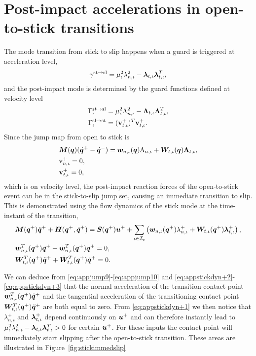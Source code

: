 \documentclass[../DC2017114Bouma.tex]{subfiles}
\begin{document}
\section{Post-impact accelerations in open-to-stick transitions}\label{app:instantslip}
The mode transition from stick to slip happens when a guard is triggered at acceleration level, 
\begin{align}
\gamma^{\text{st}\rightarrow\text{sl}} = \mu_{\iota}^2\lambda_{n,\iota}^2 - \boldsymbol{\lambda}_{t,\iota}\boldsymbol{\lambda}_{t,\iota}^T,
\end{align}
and the post-impact mode is determined by the guard functions defined at velocity level
\begin{align}
\Gamma^{\text{st}\rightarrow\text{sl}}_{\iota} &= \mu_{\iota}^2\Lambda_{n,\iota}^2 - \boldsymbol{\Lambda}_{t,\iota}\boldsymbol{\Lambda}_{t,\iota}^T,\\
\Gamma^{\text{sl}\rightarrow\text{st}}_{\iota} &= (\mathbf{v}^+_{t,\iota})^T\mathbf{v}^+_{t,\iota}.
\end{align}
Since the jump map from open to stick is
\begin{align}
&{\boldsymbol{M}}({\boldsymbol{q}})(\dot{{\boldsymbol{q}}}^+ - \dot{{\boldsymbol{q}}}^-) = {\boldsymbol{w}}_{n,\iota}({\boldsymbol{q}})\Lambda_{n,\iota} + {\boldsymbol{W}}_{t,\iota}({\boldsymbol{q}})\boldsymbol{\Lambda}_{t,\iota},\label{eq:appjump8}\\
&\mathrm{v}_{n,\iota}^+ = 0,\label{eq:appjump9}\\
&\mathbf{v}_{t,\iota}^+ = 0,\label{eq:appjump10}
\end{align}
which is on velocity level, the post-impact reaction forces of the open-to-stick event can be in the stick-to-slip jump set, causing an immediate transition to slip. This is demonstrated using the flow dynamics of the stick mode at the time-instant of the transition,
\begin{align}
&{\boldsymbol{M}}({\boldsymbol{q}}^+)\ddot{{\boldsymbol{q}}}^+ + {\boldsymbol{H}}({\boldsymbol{q}}^+,\dot{{\boldsymbol{q}}}^+) = {\boldsymbol{S}}({\boldsymbol{q}}^+){\boldsymbol{u}}^+ + \sum_{\iota\in\mathcal{I}_c}\left({\boldsymbol{w}}_{n,\iota}({\boldsymbol{q}}^+)\lambda^+_{n,\iota} + {\boldsymbol{W}}_{t,\iota}({\boldsymbol{q}}^+)\boldsymbol{\lambda}^+_{t,\iota} \right), \label{eq:appstickdyn+1}\\
&{\boldsymbol{w}}^T_{n,\iota}({\boldsymbol{q}}^+)\ddot{{\boldsymbol{q}}}^+ + \dot{{\boldsymbol{w}}}^T_{n,\iota}({\boldsymbol{q}}^+)\dot{{\boldsymbol{q}}}^+ = 0,\label{eq:appstickdyn+2}\\
&{\boldsymbol{W}}^T_{t,\iota}({\boldsymbol{q}}^+)\ddot{{\boldsymbol{q}}}^+ + \dot{{\boldsymbol{W}}}^T_{t,\iota}({\boldsymbol{q}}^+)\dot{{\boldsymbol{q}}}^+ = 0.\label{eq:appstickdyn+3}
\end{align}

We can deduce from \eqref{eq:appjump9}-\eqref{eq:appjump10} and \eqref{eq:appstickdyn+2}-\eqref{eq:appstickdyn+3} that the normal acceleration of the transition contact point ${\boldsymbol{w}}^T_{n,\iota}({\boldsymbol{q}}^+)\ddot{{\boldsymbol{q}}}^+$ and the tangential acceleration of the transitioning contact point ${\boldsymbol{W}}^T_{t,\iota}({\boldsymbol{q}}^+)\ddot{{\boldsymbol{q}}}^+$ are both equal to zero. From \eqref{eq:appstickdyn+1} we then notice that $\lambda_{n,\iota}^+$ and $\boldsymbol{\lambda}_{t,\iota}^+$ depend continuously on ${\boldsymbol{u}}^+$ and can therefore instantly lead to $\mu_{\iota}^2\lambda_{n,\iota}^2 - \boldsymbol{\lambda}_{t,\iota}\boldsymbol{\lambda}_{t,\iota}^T>0$ for certain ${\boldsymbol{u}}^+$. For these inputs the contact point will immediately start slipping after the open-to-stick transition. These areas are illustrated in Figure~\ref{fig:stickimmedslip}
\end{document}
